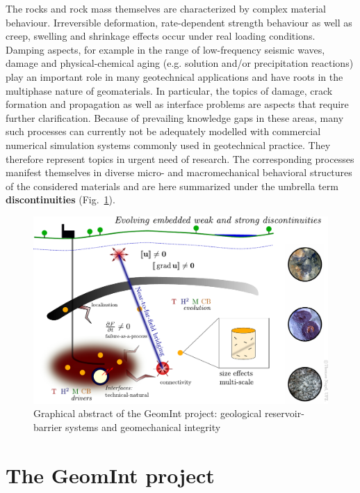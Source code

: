 The rocks and rock mass themselves are characterized by complex material behaviour. Irreversible deformation, rate-dependent strength behaviour as well as creep, swelling and shrinkage effects occur under real loading conditions. Damping aspects, for example in the range of low-frequency seismic waves, damage and physical-chemical aging (e.g. solution and/or precipitation reactions) play an important role in many geotechnical applications and have roots in the multiphase nature of geomaterials. In particular, the topics of damage, crack formation and propagation as well as interface problems are aspects that require further clarification. Because of prevailing knowledge gaps in these areas, many such processes can currently not be adequately modelled with commercial numerical simulation systems commonly used in geotechnical practice. They therefore represent topics in urgent need of research. The corresponding processes manifest themselves in diverse micro- and macromechanical behavioral structures of the considered materials and are here summarized under the umbrella term \textbf{discontinuities} (Fig.~\ref{fig:pro01}).

\begin{figure}[ht!]
\centering
\includegraphics[width=1\textwidth]{figures/Barrier_concept.pdf}
\caption{Graphical abstract of the GeomInt project: geological reservoir-barrier systems and geomechanical integrity}
\label{fig:pro01}
\end{figure}

\section{The GeomInt project}
\label{sec:geomint}

